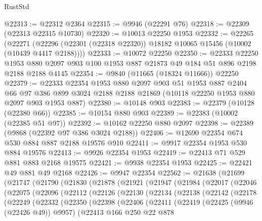 \begin{lexlean}{RustStd}
\begin{coremodule}
@22313 := @22312 @2364
@22315 := @9946 (@22291 @76)
@22318 := @22309 (@22313 @22315 @10730)
@22320 := @10013 @22250 @1953
@22332 := @22265
    (@22271 (@22296 (@22301 (@22318 @22320)) @18182 @10065 @15456 (@10002 (@10439 @4417 @2188))))
@22333 := @10072 @22250
@22350 := @22333
    @22250
    @1953
    @880
    @2097
    @903
    @100
    @1953
    @887
    @21873
    @49
    @184
    @51
    @896
    @2198
    @2188
    @2188
    @4145
@22354 := @9840 (@11665 (@18324 @11666)) @22250
@22379 := @22333
    @22354
    @1953
    @880
    @2097
    @903
    @51
    @1953
    @887
    @2404
    @66
    @97
    @386
    @899
    @3024
    @2188
    @2188
    @21869
    (@10118 @22250 @1953 @880 @2097 @903 @1953 @887)
@22380 := @10148 @903
@22383 := @22379 (@10128 (@22380 @66))
@22385 := @10154 @880 @903
@22389 := @22383 (@10002 (@22385 @51 @97))
@22392 := @10162 @22250 @880 @2097
@22398 := @22389 (@9868 (@22392 @97 @386 @3024 @2188))
@22406 := @12690 @22354 @674 @530 @884 @887 @2188 @19576 @910
@22411 := @9917 @22354 @1953 @530 @884 @19576
@22413 := @9926 @22354 @1953
@22419 := @22413 @71 @529 @881 @883 @2168 @19575
@22421 := @9938 @22354 @1953
@22425 := @22421 @49 @881 @49 @2168
@22426 := @9947 @22354
@22562 := @21638
    (@21699
      (@21747
        (@21790
          (@21830
            (@21878
              (@21921
                (@21947
                  (@21984
                    (@22017
                      (@22046
                        (@22075
                          (@22096
                            (@22112
                              (@22126
                                (@22130
                                  (@22134
                                    (@22138
                                      (@22142
                                        (@22178
                                          (@22249
                                            (@22332
                                              (@22350
                                                (@22398
                                                  (@22406
                                                    (@22411
                                                      (@22419
                                                        (@22425 (@9946 (@22426 @49)) @9957)
                                                        (@22413
                                                          @166
                                                          @250
                                                          @22
                                                          @878

\end{coremodule}
\end{lexlean}
